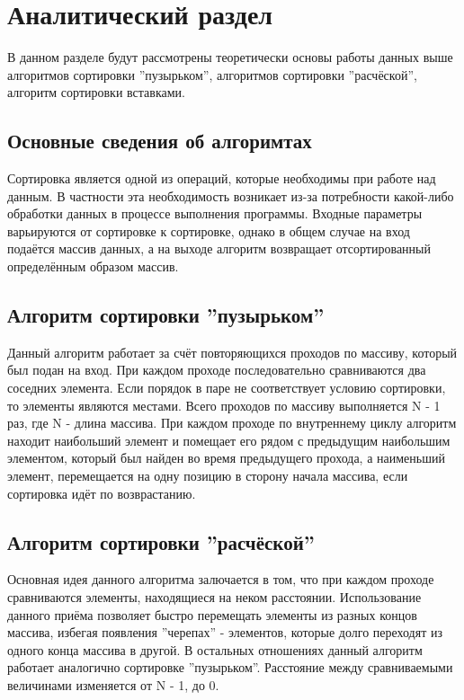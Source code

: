 \chapter{Аналитический раздел}
В данном разделе будут рассмотрены теоретически основы работы данных выше алгоритмов сортировки ''пузырьком'', алгоритмов сортировки ''расчёской'', алгоритм сортировки вставками.

\section{Основные сведения об алгоримтах}
Сортировка является одной из операций, которые необходимы при работе над данным. В частности эта необходимость возникает из-за потребности какой-либо обработки данных в процессе выполнения программы. Входные параметры варьируются от сортировке к сортировке, однако в общем случае на вход подаётся массив данных, а на выходе алгоритм возвращает отсортированный определённым образом массив.

\section{Алгоритм сортировки ''пузырьком''}
Данный алгоритм работает за счёт повторяющихся проходов по массиву, который был подан на вход. При каждом проходе последовательно сравниваются два соседних элемента. Если порядок в паре не соответствует условию сортировки, то элементы являются местами. Всего проходов по массиву выполняется N - 1 раз, где N - длина массива. При каждом проходе по внутреннему циклу алгоритм находит наибольший элемент и помещает его рядом с предыдущим наибольшим элементом, который был найден во время предыдущего прохода, а наименьший элемент, перемещается на одну позицию в сторону начала массива, если сортировка идёт по возврастанию. 

\section{Алгоритм сортировки ''расчёской''}
Основная идея данного алгоритма залючается в том, что при каждом проходе сравниваются элементы, находящиеся на неком расстоянии. Использование данного приёма позволяет быстро перемещать элементы из разных концов массива, избегая появления ''черепах'' - элементов, которые долго переходят из одного конца массива в другой. В остальных отношениях данный алгоритм работает аналогично сортировке ''пузырьком''. Расстояние между сравниваемыми величинами изменяется от N - 1, до 0.

